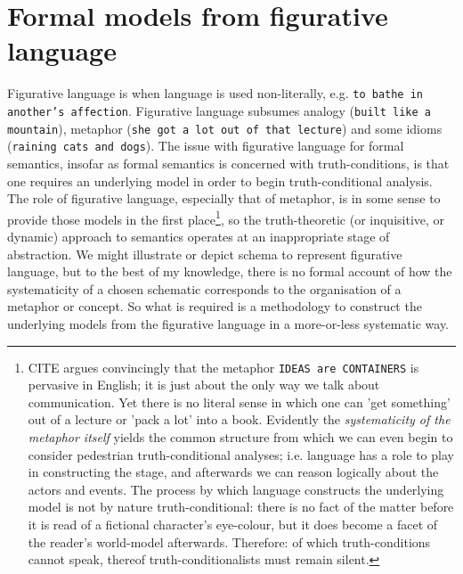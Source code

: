 \section{Formal models from figurative language}

Figurative language is when language is used non-literally, e.g. \texttt{to bathe in another's affection}. Figurative language subsumes analogy (\texttt{built like a mountain}), metaphor (\texttt{she got a lot out of that lecture}) and some idioms (\texttt{raining cats and dogs}). The issue with figurative language for formal semantics, insofar as formal semantics is concerned with truth-conditions, is that one requires an underlying model in order to begin truth-conditional analysis. The role of figurative language, especially that of metaphor, is in some sense to provide those models in the first place\footnote{\bR CITE \e argues convincingly that the metaphor \texttt{IDEAS are CONTAINERS} is pervasive in English; it is just about the only way we talk about communication. Yet there is no literal sense in which one can 'get something' out of a lecture or 'pack a lot' into a book. Evidently the \emph{systematicity of the metaphor itself} yields the common structure from which we can even begin to consider pedestrian truth-conditional analyses; i.e. language has a role to play in constructing the stage, and afterwards we can reason logically about the actors and events. The process by which language constructs the underlying model is not by nature truth-conditional: there is no fact of the matter before it is read of a fictional character's eye-colour, but it does become a facet of the reader's world-model afterwards. Therefore: of which truth-conditions cannot speak, thereof truth-conditionalists must remain silent.}, so the truth-theoretic (or inquisitive, or dynamic) approach to semantics operates at an inappropriate stage of abstraction. We might illustrate or depict schema to represent figurative language, but to the best of my knowledge, there is no formal account of how the systematicity of a chosen schematic corresponds to the organisation of a metaphor or concept. So what is required is a methodology to construct the underlying models from the figurative language in a more-or-less systematic way.\\

